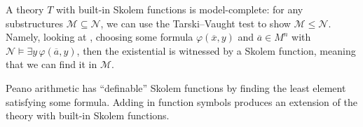 \documentclass[../notes.tex]{subfiles}
\begin{document}
\begin{remark}
	A theory $T$ with built-in Skolem functions is model-complete: for any substructures $\mathcal M\subseteq\mathcal N$, we can use the Tarski--Vaught test to show $\mathcal M\le\mathcal N$. Namely, looking at , choosing some formula $\varphi(\overline x,y)$ and $\overline a\in M^n$ with $\mathcal N\models\exists y\,\varphi(\overline a,y)$, then the existential is witnessed by a Skolem function, meaning that we can find it in $\mathcal M$.
\end{remark}
\begin{example}
	Peano arithmetic has ``definable'' Skolem functions by finding the least element satisfying some formula. Adding in function symbols produces an extension of the theory with built-in Skolem functions.
\end{example}
\end{document}
